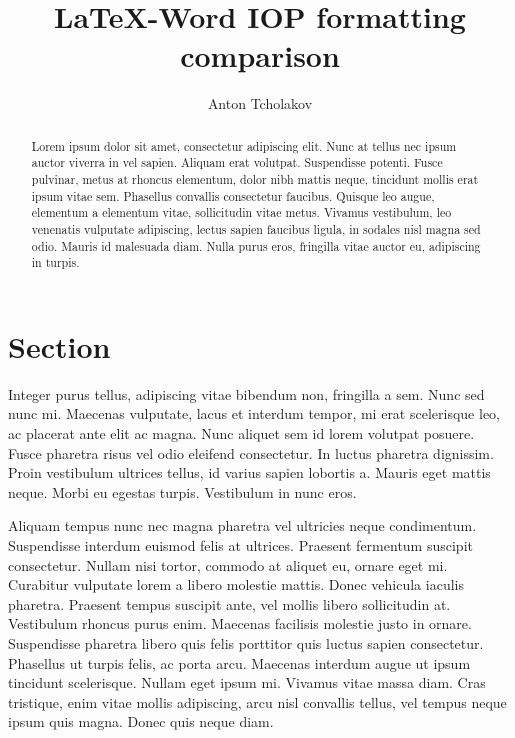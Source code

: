 \documentclass[11pt]{iopart}
\begin{document}
\title[]{LaTeX-Word IOP formatting comparison}

\author{Anton Tcholakov}

\address{Department of Physics,
University of Bath, Bath BA2 7AY, United Kingdom}
\begin{abstract}
Lorem ipsum dolor sit amet, consectetur adipiscing elit. Nunc at tellus nec ipsum auctor viverra in vel sapien. Aliquam erat volutpat. Suspendisse potenti. Fusce pulvinar, metus at rhoncus elementum, dolor nibh mattis neque, tincidunt mollis erat ipsum vitae sem. Phasellus convallis consectetur faucibus. Quisque leo augue, elementum a elementum vitae, sollicitudin vitae metus. Vivamus vestibulum, leo venenatis vulputate adipiscing, lectus sapien faucibus ligula, in sodales nisl magna sed odio. Mauris id malesuada diam. Nulla purus eros, fringilla vitae auctor eu, adipiscing in turpis.
\end{abstract}


\section{Section}
Integer purus tellus, adipiscing vitae bibendum non, fringilla a sem. Nunc sed nunc mi. Maecenas vulputate, lacus et interdum tempor, mi erat scelerisque leo, ac placerat ante elit ac magna. Nunc aliquet sem id lorem volutpat posuere. Fusce pharetra risus vel odio eleifend consectetur. In luctus pharetra dignissim. Proin vestibulum ultrices tellus, id varius sapien lobortis a. Mauris eget mattis neque. Morbi eu egestas turpis. Vestibulum in nunc eros.

Aliquam tempus nunc nec magna pharetra vel ultricies neque condimentum. Suspendisse interdum euismod felis at ultrices. Praesent fermentum suscipit consectetur. Nullam nisi tortor, commodo at aliquet eu, ornare eget mi. Curabitur vulputate lorem a libero molestie mattis. Donec vehicula iaculis pharetra. Praesent tempus suscipit ante, vel mollis libero sollicitudin at. Vestibulum rhoncus purus enim. Maecenas facilisis molestie justo in ornare. Suspendisse pharetra libero quis felis porttitor quis luctus sapien consectetur. Phasellus ut turpis felis, ac porta arcu. Maecenas interdum augue ut ipsum tincidunt scelerisque. Nullam eget ipsum mi. Vivamus vitae massa diam. Cras tristique, enim vitae mollis adipiscing, arcu nisl convallis tellus, vel tempus neque ipsum quis magna. Donec quis neque diam.
\end{document}
